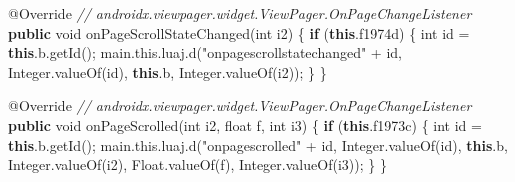 \documentclass[
]{article}
\newenvironment{Shaded}{}{}
\newcommand{\AttributeTok}[1]{\textcolor[rgb]{0.49,0.56,0.16}{#1}}
\newcommand{\BuiltInTok}[1]{\textcolor[rgb]{0.00,0.50,0.00}{#1}}
\newcommand{\CommentTok}[1]{\textcolor[rgb]{0.38,0.63,0.69}{\textit{#1}}}
\newcommand{\ControlFlowTok}[1]{\textcolor[rgb]{0.00,0.44,0.13}{\textbf{#1}}}
\newcommand{\DataTypeTok}[1]{\textcolor[rgb]{0.56,0.13,0.00}{#1}}
\newcommand{\FunctionTok}[1]{\textcolor[rgb]{0.02,0.16,0.49}{#1}}
\newcommand{\KeywordTok}[1]{\textcolor[rgb]{0.00,0.44,0.13}{\textbf{#1}}}
\newcommand{\NormalTok}[1]{#1}
\newcommand{\OperatorTok}[1]{\textcolor[rgb]{0.40,0.40,0.40}{#1}}
\newcommand{\StringTok}[1]{\textcolor[rgb]{0.25,0.44,0.63}{#1}}
\begin{document}
\begin{Shaded}
\begin{Highlighting}[]
        \AttributeTok{@Override} \CommentTok{// androidx.viewpager.widget.ViewPager.OnPageChangeListener}
        \KeywordTok{public} \DataTypeTok{void} \FunctionTok{onPageScrollStateChanged}\OperatorTok{(}\DataTypeTok{int}\NormalTok{ i2}\OperatorTok{)} \OperatorTok{\{}
            \ControlFlowTok{if} \OperatorTok{(}\KeywordTok{this}\OperatorTok{.}\FunctionTok{f1974d}\OperatorTok{)} \OperatorTok{\{}
                \DataTypeTok{int}\NormalTok{ id }\OperatorTok{=} \KeywordTok{this}\OperatorTok{.}\FunctionTok{b}\OperatorTok{.}\FunctionTok{getId}\OperatorTok{();}
\NormalTok{                main}\OperatorTok{.}\FunctionTok{this}\OperatorTok{.}\FunctionTok{luaj}\OperatorTok{.}\FunctionTok{d}\OperatorTok{(}\StringTok{"onpagescrollstatechanged"} \OperatorTok{+}\NormalTok{ id}\OperatorTok{,} \BuiltInTok{Integer}\OperatorTok{.}\FunctionTok{valueOf}\OperatorTok{(}\NormalTok{id}\OperatorTok{),} \KeywordTok{this}\OperatorTok{.}\FunctionTok{b}\OperatorTok{,} \BuiltInTok{Integer}\OperatorTok{.}\FunctionTok{valueOf}\OperatorTok{(}\NormalTok{i2}\OperatorTok{));}
            \OperatorTok{\}}
        \OperatorTok{\}}

        \AttributeTok{@Override} \CommentTok{// androidx.viewpager.widget.ViewPager.OnPageChangeListener}
        \KeywordTok{public} \DataTypeTok{void} \FunctionTok{onPageScrolled}\OperatorTok{(}\DataTypeTok{int}\NormalTok{ i2}\OperatorTok{,} \DataTypeTok{float}\NormalTok{ f}\OperatorTok{,} \DataTypeTok{int}\NormalTok{ i3}\OperatorTok{)} \OperatorTok{\{}
            \ControlFlowTok{if} \OperatorTok{(}\KeywordTok{this}\OperatorTok{.}\FunctionTok{f1973c}\OperatorTok{)} \OperatorTok{\{}
                \DataTypeTok{int}\NormalTok{ id }\OperatorTok{=} \KeywordTok{this}\OperatorTok{.}\FunctionTok{b}\OperatorTok{.}\FunctionTok{getId}\OperatorTok{();}
\NormalTok{                main}\OperatorTok{.}\FunctionTok{this}\OperatorTok{.}\FunctionTok{luaj}\OperatorTok{.}\FunctionTok{d}\OperatorTok{(}\StringTok{"onpagescrolled"} \OperatorTok{+}\NormalTok{ id}\OperatorTok{,} \BuiltInTok{Integer}\OperatorTok{.}\FunctionTok{valueOf}\OperatorTok{(}\NormalTok{id}\OperatorTok{),} \KeywordTok{this}\OperatorTok{.}\FunctionTok{b}\OperatorTok{,} \BuiltInTok{Integer}\OperatorTok{.}\FunctionTok{valueOf}\OperatorTok{(}\NormalTok{i2}\OperatorTok{),} \BuiltInTok{Float}\OperatorTok{.}\FunctionTok{valueOf}\OperatorTok{(}\NormalTok{f}\OperatorTok{),} \BuiltInTok{Integer}\OperatorTok{.}\FunctionTok{valueOf}\OperatorTok{(}\NormalTok{i3}\OperatorTok{));}
            \OperatorTok{\}}
        \OperatorTok{\}}


\end{Highlighting}
\end{Shaded}
\end{document}
